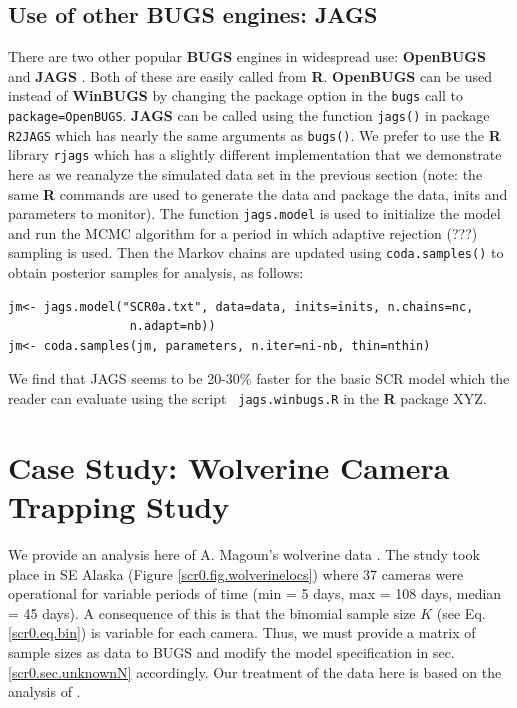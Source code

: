 \subsection{Use of other BUGS engines: JAGS}

There are two other popular {\bf BUGS} engines in widespread use: {\bf OpenBUGS}
\citep{thomas_etal:2006} and {\bf JAGS} \citep{plummer:2003}. Both of these
are easily called from {\bf R}. {\bf OpenBUGS} can be used instead of
{\bf WinBUGS} by
changing the package option in the \mbox{\tt bugs} call to \mbox{\tt package=OpenBUGS}.
{\bf JAGS} can be called using the function \mbox{\tt jags()} in
package \mbox{\tt R2JAGS} which
has nearly the same arguments as \mbox{\tt bugs()}.  We prefer to use
the {\bf R}
library \mbox{\tt rjags} \citep{plummer:2009} which has a slightly different
implementation that we demonstrate here as we reanalyze the simulated
data set in the previous section (note: the same {\bf R} commands are used
to generate the data and package the data, inits and parameters to
monitor). The function \mbox{\tt jags.model} is used to initialize the model and
run the MCMC algorithm for a period in which adaptive rejection (???)
sampling is used. Then the Markov chains are updated using
\mbox{\tt coda.samples()} to obtain posterior samples for analysis, as follows:
\begin{verbatim}
jm<- jags.model("SCR0a.txt", data=data, inits=inits, n.chains=nc,
                 n.adapt=nb))
jm<- coda.samples(jm, parameters, n.iter=ni-nb, thin=nthin)
\end{verbatim}
We find that JAGS seems to be 20-30\% faster for the basic SCR model
which the reader can evaluate using the script \mbox{\tt
  jags.winbugs.R} in the {\bf R} package XYZ. 


\section{Case Study: Wolverine Camera Trapping Study}
\label{scr0.sec.wolverine}

We provide an analysis here of A. Magoun's wolverine data
\citep{magoun_etal:2011, royle_etal:2011}. The study took place in SE
Alaska (Figure \ref{scr0.fig.wolverinelocs}) where 37 cameras were
operational for variable periods of time (min = 5 days, max = 108
days, median = 45 days).  A consequence of this is that the binomial
sample size $K$ (see Eq. \ref{scr0.eq.bin})
 is variable for each camera. Thus, we
must provide a matrix of sample sizes as data to BUGS and modify the
model specification in sec. \ref{scr0.sec.unknownN}
accordingly. Our treatment of the
data here is based on the analysis of  \citet{royle_etal:2011}.

